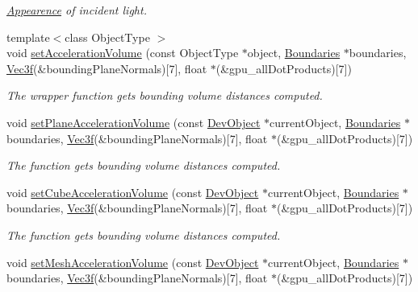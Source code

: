 \begin{DoxyCompactItemize}
\begin{DoxyCompactList}\small\item\em \hyperlink{struct_appearence}{Appearence} of incident light. \end{DoxyCompactList}\item 
{\footnotesize template$<$class Object\+Type $>$ }\\void \hyperlink{r_t_tracer_2source_2describers_8cu_a62894bfe2e9e2b1cd55216c772eafb27}{set\+Acceleration\+Volume} (const Object\+Type $\ast$object, \hyperlink{class_boundaries}{Boundaries} $\ast$boundaries, \hyperlink{class_vec3}{Vec3f}(\&bounding\+Plane\+Normals)\mbox{[}7\mbox{]}, float $\ast$(\&gpu\+\_\+all\+Dot\+Products)\mbox{[}7\mbox{]})
\begin{DoxyCompactList}\small\item\em The wrapper function gets bounding volume distances computed. \end{DoxyCompactList}\item 
void \hyperlink{group__intersection__test__prperties_ga684f41eb2add27e32a7c0115cdd6cce1}{set\+Plane\+Acceleration\+Volume} (const \hyperlink{class_dev_object}{Dev\+Object} $\ast$current\+Object, \hyperlink{class_boundaries}{Boundaries} $\ast$boundaries, \hyperlink{class_vec3}{Vec3f}(\&bounding\+Plane\+Normals)\mbox{[}7\mbox{]}, float $\ast$(\&gpu\+\_\+all\+Dot\+Products)\mbox{[}7\mbox{]})
\begin{DoxyCompactList}\small\item\em The function gets bounding volume distances computed. \end{DoxyCompactList}\item 
void \hyperlink{group__intersection__test__prperties_gabfac85fdf9d0cceb70aefa4c2ed71ad2}{set\+Cube\+Acceleration\+Volume} (const \hyperlink{class_dev_object}{Dev\+Object} $\ast$current\+Object, \hyperlink{class_boundaries}{Boundaries} $\ast$boundaries, \hyperlink{class_vec3}{Vec3f}(\&bounding\+Plane\+Normals)\mbox{[}7\mbox{]}, float $\ast$(\&gpu\+\_\+all\+Dot\+Products)\mbox{[}7\mbox{]})
\begin{DoxyCompactList}\small\item\em The function gets bounding volume distances computed. \end{DoxyCompactList}\item 
void \hyperlink{group__intersection__test__prperties_ga672ecbee3aea2f5567ad7a2611feef3e}{set\+Mesh\+Acceleration\+Volume} (const \hyperlink{class_dev_object}{Dev\+Object} $\ast$current\+Object, \hyperlink{class_boundaries}{Boundaries} $\ast$boundaries, \hyperlink{class_vec3}{Vec3f}(\&bounding\+Plane\+Normals)\mbox{[}7\mbox{]}, float $\ast$(\&gpu\+\_\+all\+Dot\+Products)\mbox{[}7\mbox{]})

\end{DoxyCompactItemize}
